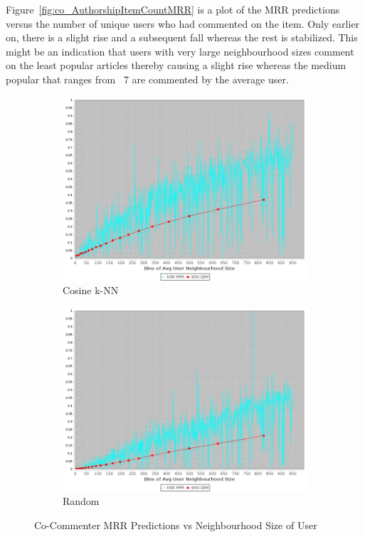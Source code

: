 Figure~\ref{fig:co_AuthorshipItemCountMRR} is a plot of the MRR predictions versus the number of unique users who had commented on the item. Only earlier on, there is a slight rise and a subsequent fall whereas the rest is stabilized. This might be an indication that users with very large neighbourhood sizes comment on the least popular articles thereby causing a slight rise whereas the medium popular that ranges from ~7 are commented by the average user.

\begin{figure}[!h]
\centering
\begin{subfigure}[b]{0.475\textwidth}
    \centering
    \includegraphics[width=\textwidth]{c-inv_images/co_AuthorshipUserNeighMRR.jpeg}
    \caption{Cosine k-NN}
\end{subfigure}
\begin{subfigure}[b]{0.475\textwidth}
    \centering
    \includegraphics[width=\textwidth]{c-inv_images/randCo_AuthorshipUserNeighMRR.jpeg}
    \caption{Random}
\end{subfigure}
\caption{Co-Commenter MRR Predictions vs Neighbourhood Size of User}
\label{fig:co_AuthorshipUserNeighMRR}
\end{figure}

